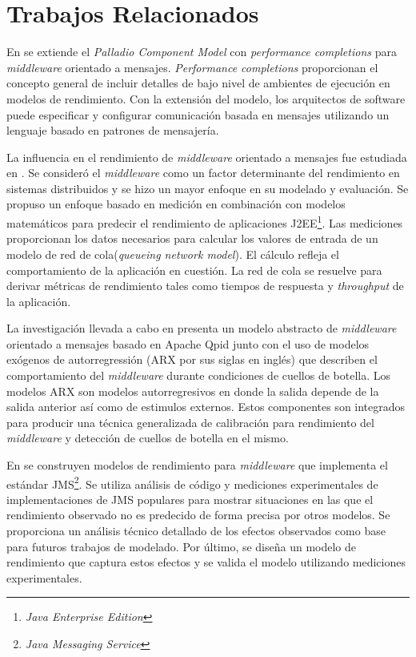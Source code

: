 \documentclass[article]{IEEEtran}
\begin{document}
\section{Trabajos Relacionados} \label{sec:trabajos-relacionados}
En \cite{happe-et-al} se extiende el \emph{Palladio Component Model} con \emph{performance completions} para \emph{middleware} orientado a mensajes. \emph{Performance completions}\cite{woodside-et-al-2} proporcionan el concepto general de incluir detalles de bajo nivel de ambientes de ejecución en modelos de rendimiento. Con la extensión del modelo, los arquitectos de software puede especificar y configurar comunicación basada en mensajes utilizando un lenguaje basado en patrones de mensajería.

La influencia en el rendimiento de \emph{middleware} orientado a mensajes fue estudiada en \cite{liu-gordon}. Se consideró el \emph{middleware} como un factor determinante del rendimiento en sistemas distribuidos y se hizo un mayor enfoque en su modelado y evaluación. Se propuso un enfoque basado en medición en combinación con modelos matemáticos para predecir el rendimiento de aplicaciones J2EE\footnote{\emph{Java Enterprise Edition}}. Las mediciones proporcionan los datos necesarios para calcular los valores de entrada de un modelo de red de cola(\emph{queueing network model}). El cálculo refleja el comportamiento de la aplicación en cuestión. La red de cola se resuelve para derivar métricas de rendimiento tales como tiempos de respuesta y \emph{throughput} de la aplicación. 

La investigación llevada a cabo en \cite{chew} presenta un modelo abstracto de \emph{middleware} orientado a mensajes basado en Apache Qpid junto con el uso de modelos exógenos de autorregressión (ARX por sus siglas en inglés) que describen el comportamiento del \emph{middleware} durante condiciones de cuellos de botella. Los modelos ARX son modelos autorregresivos en donde la salida depende de la salida anterior así como de estimulos externos. Estos componentes son integrados para producir una técnica generalizada de calibración para rendimiento del \emph{middleware} y detección de cuellos de botella en el mismo.

En \cite{martinec-et-al} se construyen modelos de rendimiento para \emph{middleware} que implementa el estándar JMS\footnote{\emph{Java Messaging Service}}. Se utiliza análisis de código y mediciones experimentales de implementaciones de JMS populares para mostrar situaciones en las que el rendimiento observado no es predecido de forma precisa por otros modelos. Se proporciona un análisis técnico detallado de los efectos observados como base para futuros trabajos de modelado. Por último, se diseña un modelo de rendimiento que captura estos efectos y se valida el modelo utilizando mediciones experimentales.
\end{document}

